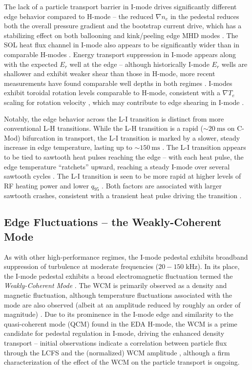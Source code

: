 The lack of a particle transport barrier in I-mode drives significantly different edge behavior compared to H-mode -- the reduced $\nabla n_e$ in the pedestal reduces both the overall pressure gradient and the bootstrap current drive, which has a stabilizing effect on both ballooning and kink/peeling edge MHD modes \cite{Hughes2013}.  The SOL heat flux channel in I-mode also appears to be significantly wider than in comparable H-modes \cite{Whyte2010,Hubbard2012b}.  Energy transport suppression in I-mode appears along with the expected $E_r$ well at the edge -- although historically I-mode $E_r$ wells are shallower and exhibit weaker shear than those in H-mode, more recent measurements have found comparable well depths in both regimes \cite{McDermott2009,Theiler2014}.  I-modes exhibit toroidal rotation levels comparable to H-mode, consistent with a $\nabla T_e$ scaling for rotation velocity \cite{Rice2011}, which may contribute to edge shearing in I-mode \cite{McDermott2009}.

Notably, the edge behavior across the L-I transition is distinct from more conventional L-H transitions.  While the L-H transition is a rapid ($\sim \SI{20}{\milli\second}$ on C-Mod) bifurcation in transport, the L-I transition is marked by a slower, steady increase in edge temperature, lasting up to $\sim\SI{150}{\milli\second}$ \cite{McDermott2009,Whyte2010}.  The L-I transition appears to be tied to sawtooth heat pulses reaching the edge -- with each heat pulse, the edge temperature ``ratchets'' upward, reaching a steady I-mode over several sawtooth cycles \cite{Hubbard2011,Hubbard2012}.  The L-I transition is seen to be more rapid at higher levels of RF heating power and lower $q_{95}$ \cite{Whyte2010}.  Both factors are associated with larger sawtooth crashes, consistent with a transient heat pulse driving the transition \cite{Hubbard2012}.

\subsection{Edge Fluctuations -- the Weakly-Coherent Mode}\label{subsec:hcr_imode_wcm}

As with other high-performance regimes, the I-mode pedestal exhibits broadband suppression of turbulence at moderate frequencies ($20-150\;\si{\kilo\hertz}$).  In its place, the I-mode pedestal exhibits a broad electromagnetic fluctuation termed the \emph{Weakly-Coherent Mode} \cite{Whyte2010}.  The WCM is primarily observed as a density and magnetic fluctuation, although temperature fluctuations associated with the mode are also observed (albeit at an amplitude reduced by roughly an order of magnitude) \cite{Cziegler2013,Dominguez2012,White2011}.  Due to its prominence in the I-mode edge and similarity to the quasi-coherent mode (QCM) found in the EDA H-mode, the WCM is a prime candidate for pedestal regulation in I-mode, driving the enhanced density transport -- initial observations indicate a correlation between particle flux through the LCFS and the (normalized) WCM amplitude \cite{Dominguez2012}, although a firm characterization of the effect of the WCM on the particle transport is ongoing.

